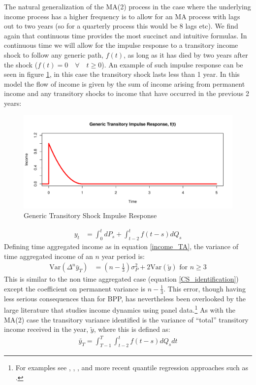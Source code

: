 \documentclass[titlepage]{\econtex}\newcommand{\texname}{IncomeUncertainty}
\begin{document}
The natural generalization of the MA(2) process in the case where the underlying income process has a higher frequency is to allow for an MA process with lags out to two years (so for a quarterly process this would be 8 lags etc). We find again that continuous time provides the most succinct and intuitive formulas. In continuous time we will allow for the impulse response to a transitory income shock to follow any generic path, $f(t)$, as long as it has died by two years after the shock ($f(t)=0 \quad \forall \quad t \geq 0$). An example of such impulse response can be seen in figure \ref{fig:GenericTransitory}, in this case the transitory shock lasts less than 1 year. In this model the flow of income is given by the sum of income arising from permanent income and any transitory shocks to income that have occurred in the previous 2 years:
	\begin{figure} 
	\begin{centering}
		\includegraphics[scale=0.7]{Figures/GenericTransitory.png} 
		\caption{Generic Transitory Shock Impulse Response}
		\label{fig:GenericTransitory}
	\end{centering}
\end{figure}
\begin{align*}
y_t &= \int_{0}^{t} dP_s + \int_{t-2}^{t} f(t-s)dQ_s
\end{align*}
Defining time aggregated income as in equation \ref{income_TA}, the variance of time aggregated income of an $n$ year period is:
	\begin{align}
\mathrm{Var}(\Delta^n \bar{y}_T) &= (n-\frac{1}{3})\sigma^2_P +  2 \mathrm{Var}(\tilde{y}) \text{   for }n \geq 3 \label{variance}
\end{align}
This is similar to the non time aggregated case (equation \ref{CS_identification}) except the coefficient on permanent variance is $n-\frac{1}{3}$. This error, though having less serious consequences than for BPP, has nevertheless been overlooked by the large literature that studies income dynamics using panel data.\footnote{For examples see \cite{moffitt_trends_2012}, \cite{meghir_income_2004}, \cite{nielsen_impact_2004}, \cite{heathcote_unequal_2010} and more recent quantile regression approaches such as \cite{arellano_earnings_2017}.} As with the MA(2) case the transitory variance identified is the variance of ``total'' transitory income received in the year, $\tilde{y}$, where this is defined as:
\begin{align}
\tilde{y_T} = \int_{T-1}^{T}\int_{t-2}^{t} f(t-s)dQ_s dt \label{tot_income}
\end{align}
\end{document}
